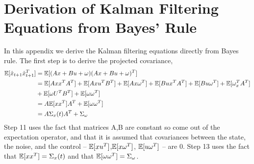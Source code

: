 \chapter{Derivation of Kalman Filtering Equations from Bayes' Rule}

In this appendix we derive the Kalman filtering equations directly from Bayes rule. The first step is to derive the projected covariance,
\begin{align}
    \mathbb{E}[\hat{x}_{t+1}\hat{x}_{t+1}^T] &= \mathbb{E}[(Ax + Bu + \omega)(Ax + Bu + \omega)^T] \\
    &= \mathbb{E}[Ax x^TA^T] + \mathbb{E}[Ax u^TB^T] + \mathbb{E}[Ax\omega^T] + \mathbb{E}[Bu x^TA^T] + \mathbb{E}[Bu\omega^T] + \mathbb{E}[\omega_x^T A^T] \\ &+ \mathbb{E}[\omega U^TB^T] + \mathbb{E}[\omega\omega^T] \\
    &= A \mathbb{E}[xx^T]A^T + \mathbb{E}[\omega\omega^T] \\
    &= A\Sigma_x(t)A^T + \Sigma_\omega 
\end{align}
Step 11 uses the fact that matrices A,B are constant so come out of the expectation operator, and that it is assumed that covariances between the state, the noise, and the control -- $\mathbb{E}[x u^T]$,$\mathbb{E}[x\omega^T]$, $\mathbb{E}[u\omega^T]$ -- are 0. Step 13 uses the fact that $\mathbb{E}[xx^T] = \Sigma_x(t)$ and that $\mathbb{E}[\omega\omega^T] = \Sigma_\omega$.

